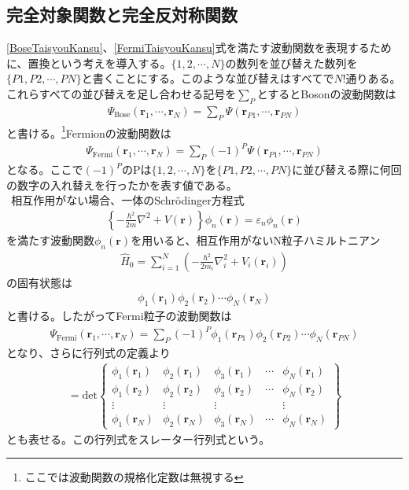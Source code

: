 \documentclass[dvipdfmx, 11pt, a4paper]{jsarticle}
\theoremstyle{definition}
\numberwithin{equation}{section}
\begin{document}
\subsection{完全対象関数と完全反対称関数}
    \eqref{BoseTaisyouKansu}、\eqref{FermiTaisyouKansu}式を満たす波動関数を表現するために、置換という考えを導入する。$\{1,2,\cdots,N\}$の数列を並び替えた数列を$\{P1,P2,\cdots,PN \}$と書くことにする。このような並び替えはすべてで$N!$通りある。これらすべての並び替えを足し合わせる記号を$\sum_P$とするとBosonの波動関数は
    \begin{align}
        \Psi_{\textrm{Bose}}(\bm{r}_1,\cdots,\bm{r}_N) = \sum_{P} \Psi(\bm{r}_{P1},\cdots,\bm{r}_{PN})
    \end{align}
    と書ける。\footnote{ここでは波動関数の規格化定数は無視する}Fermionの波動関数は
    \begin{align}
        \Psi_{\textrm{Fermi}}(\bm{r}_1,\cdots,\bm{r}_N) = \sum_{P} (-1)^P\Psi(\bm{r}_{P1},\cdots,\bm{r}_{PN})
    \end{align}
    となる。ここで$(-1)^P$のPは$\{1,2,\cdots,N\}$を$\{ P1,P2,\cdots,PN \}$に並び替える際に何回の数字の入れ替えを行ったかを表す値である。\\
    $\ \ $相互作用がない場合、一体のSchrödinger方程式
    \begin{align}
        \left\{ -\frac{\hbar^2}{2m} \nabla^2 + V(\bm{r})  \right\} \phi_n(\bm{r}) = \varepsilon_n \phi_n(\bm{r})
    \end{align}
    を満たす波動関数$\phi_n(\bm{r})$を用いると、相互作用がないN粒子ハミルトニアン
    \begin{align}
        \hat{H}_0 = \sum_{i=1}^N \left( -\frac{\hbar^2}{2m_i} \nabla_i^2 + V_i(\bm{r}_i) \right)
    \end{align}
    の固有状態は
    \begin{align}
        \phi_1(\bm{r}_1)\phi_2(\bm{r}_2)\cdots \phi_N(\bm{r}_N)
    \end{align}
    と書ける。したがってFermi粒子の波動関数は
    \begin{align}
        \Psi_{\textrm{Fermi}}(\bm{r}_1,\cdots,\bm{r}_N) = \sum_{P}(-1)^P \phi_1(\bm{r}_{P1})\phi_2(\bm{r}_{P2})\cdots\phi_N(\bm{r}_{PN})
    \end{align}
    となり、さらに行列式の定義より
    \begin{align}
        =\textrm{det} 
        \left\{
        \begin{matrix}
            \phi_1(\bm{r}_1)&\phi_2(\bm{r}_1)&\phi_3(\bm{r}_1)&\cdots&\phi_N(\bm{r}_1)\\
            \phi_1(\bm{r}_2)&\phi_2(\bm{r}_2)&\phi_3(\bm{r}_2)&\cdots&\phi_N(\bm{r}_2)\\
            \vdots&\vdots&\vdots&&\vdots\\
            \phi_1(\bm{r}_N)&\phi_2(\bm{r}_N)&\phi_3(\bm{r}_N)&\cdots&\phi_N(\bm{r}_N)
        \end{matrix}
        \right\}
    \end{align}
    とも表せる。この行列式をスレーター行列式という。
\end{document}
